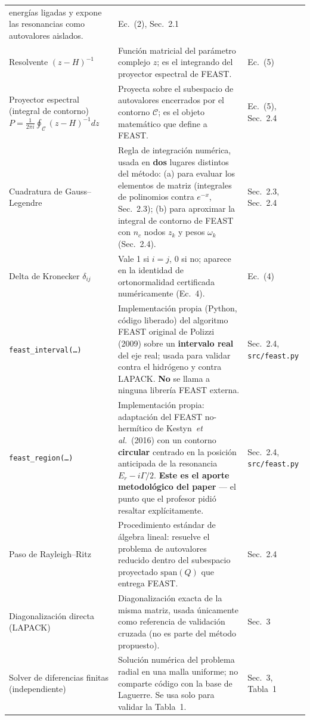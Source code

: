 \documentclass[11pt]{article}
\begin{document}
\begin{longtable}{@{}L{4.4cm}L{9.2cm}L{2.8cm}@{}}
  energ\'ias ligadas y expone las resonancias como autovalores aislados. &
  Ec.~(2), Sec.~2.1 \\
Resolvente $(z-H)^{-1}$ & Funci\'on matricial del par\'ametro complejo $z$;
  es el integrando del proyector espectral de FEAST. & Ec.~(5) \\
Proyector espectral (integral de contorno)
  $P=\frac{1}{2\pi i}\oint_{\mathcal C}(z-H)^{-1}dz$ & Proyecta sobre el
  subespacio de autovalores encerrados por el contorno $\mathcal C$; es el
  objeto matem\'atico que define a FEAST. & Ec.~(5), Sec.~2.4 \\
Cuadratura de Gauss--Legendre & Regla de integraci\'on num\'erica, usada en
  \textbf{dos} lugares distintos del m\'etodo: (a) para evaluar los
  elementos de matriz (integrales de polinomios contra $e^{-x}$, Sec.~2.3);
  (b) para aproximar la integral de contorno de FEAST con $n_c$ nodos $z_k$
  y pesos $\omega_k$ (Sec.~2.4). & Sec.~2.3, Sec.~2.4 \\
Delta de Kronecker $\delta_{ij}$ & Vale 1 si $i=j$, 0 si no; aparece en la
  identidad de ortonormalidad certificada num\'ericamente (Ec.~4). &
  Ec.~(4) \\
\texttt{feast\_interval(\ldots)} & Implementaci\'on propia (Python, c\'odigo
  liberado) del algoritmo FEAST original de Polizzi (2009) sobre un
  \textbf{intervalo real} del eje real; usada para validar contra el
  hidr\'ogeno y contra LAPACK. \textbf{No} se llama a ninguna librer\'ia
  FEAST externa. & Sec.~2.4, \texttt{src/feast.py} \\
\texttt{feast\_region(\ldots)} & Implementaci\'on propia: adaptaci\'on del
  FEAST no-herm\'itico de Kestyn~\emph{et al.}~(2016) con un contorno
  \textbf{circular} centrado en la posici\'on anticipada de la resonancia
  $E_r-i\Gamma/2$. \textbf{Este es el aporte metodol\'ogico del paper} ---
  el punto que el profesor pidi\'o resaltar expl\'icitamente. & Sec.~2.4,
  \texttt{src/feast.py} \\
Paso de Rayleigh--Ritz & Procedimiento est\'andar de \'algebra lineal:
  resuelve el problema de autovalores reducido dentro del subespacio
  proyectado $\mathrm{span}(Q)$ que entrega FEAST. & Sec.~2.4 \\
Diagonalizaci\'on directa (LAPACK) & Diagonalizaci\'on exacta de la misma
  matriz, usada \'unicamente como referencia de validaci\'on cruzada (no es
  parte del m\'etodo propuesto). & Sec.~3 \\
Solver de diferencias finitas (independiente) & Soluci\'on num\'erica del
  problema radial en una malla uniforme; no comparte c\'odigo con la base
  de Laguerre. Se usa solo para validar la Tabla~1. & Sec.~3, Tabla~1 \\
\bottomrule
\end{longtable}
\endgroup
\end{document}
